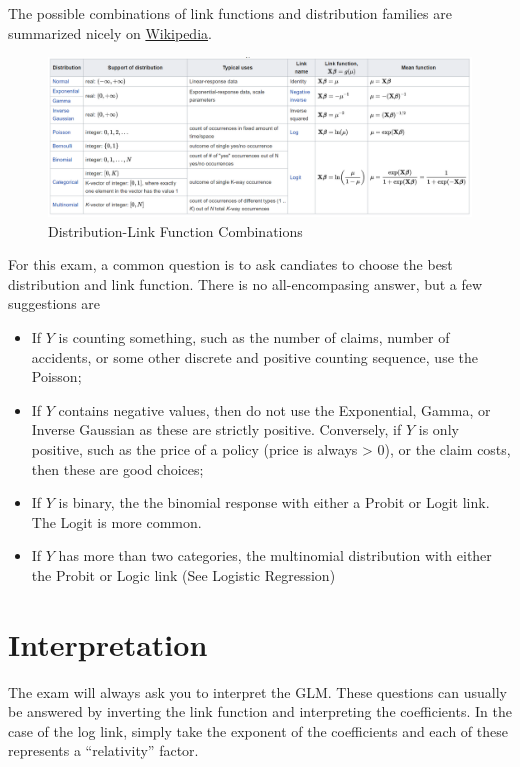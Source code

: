 \documentclass[openany]{book}
\providecommand{\tightlist}{%
  \setlength{\itemsep}{0pt}\setlength{\parskip}{0pt}}
\begin{document}
The possible combinations of link functions and distribution families are summarized nicely on \href{https://en.wikipedia.org/wiki/Generalized_linear_model\#Link_function}{Wikipedia}.

\begin{figure}
\includegraphics[width=22.32in]{images/glm_links} \caption{Distribution-Link Function Combinations}\label{fig:unnamed-chunk-14}
\end{figure}

For this exam, a common question is to ask candiates to choose the best distribution and link function. There is no all-encompasing answer, but a few suggestions are

\begin{itemize}
\tightlist
\item
  If \(Y\) is counting something, such as the number of claims, number of accidents, or some other discrete and positive counting sequence, use the Poisson;
\item
  If \(Y\) contains negative values, then do not use the Exponential, Gamma, or Inverse Gaussian as these are strictly positive. Conversely, if \(Y\) is only positive, such as the price of a policy (price is always \textgreater{} 0), or the claim costs, then these are good choices;
\item
  If \(Y\) is binary, the the binomial response with either a Probit or Logit link. The Logit is more common.
\item
  If \(Y\) has more than two categories, the multinomial distribution with either the Probit or Logic link (See Logistic Regression)
\end{itemize}

\hypertarget{interpretation}{%
\section{Interpretation}\label{interpretation}}

The exam will always ask you to interpret the GLM. These questions can usually be answered by inverting the link function and interpreting the coefficients. In the case of the log link, simply take the exponent of the coefficients and each of these represents a ``relativity'' factor.
\end{document}
